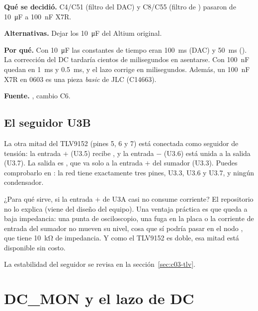 \begin{decision}
\textbf{Qué se decidió.} C4/C51 (filtro del DAC) y C8/C55 (filtro de ) pasaron de \SI{10}{\micro\farad} a
\SI{100}{\nano\farad} X7R.

\textbf{Alternativas.} Dejar los \SI{10}{\micro\farad} del Altium original.

\textbf{Por qué.} Con \SI{10}{\micro\farad} las constantes de tiempo eran \SI{100}{\milli\second} (DAC) y
\SI{50}{\milli\second} (). La corrección del DC tardaría cientos de milisegundos en asentarse. Con
\SI{100}{\nano\farad} quedan en \SI{1}{\milli\second} y \SI{0.5}{\milli\second}, y el lazo corrige en milisegundos.
Además, un \SI{100}{\nano\farad} X7R en 0603 es una pieza \emph{basic} de JLC (C14663).

\textbf{Fuente.} , cambio C6.
\end{decision}

\subsection{El seguidor U3B}

La otra mitad del TLV9152 (pines 5, 6 y 7) está conectada como seguidor de tensión: la entrada $+$ (U3.5) recibe
, y la entrada $-$ (U3.6) está unida a la salida (U3.7). La salida es , que va solo a la entrada
$+$ del sumador (U3.3). Puedes comprobarlo en : la red  tiene exactamente tres
pines, U3.3, U3.6 y U3.7, y ningún condensador.

¿Para qué sirve, si la entrada $+$ de U3A casi no consume corriente? El repositorio no lo explica (viene del diseño del
equipo). Una ventaja práctica es que  queda a baja impedancia: una punta de osciloscopio, una fuga en la
placa o la corriente de entrada del sumador no mueven su nivel, cosa que sí podría pasar en el nodo , que
tiene \SI{10}{\kilo\ohm} de impedancia. Y como el TLV9152 es doble, esa mitad está disponible sin costo.

La estabilidad del seguidor se revisa en la sección~\ref{sec:c03-tlv}.

\section{DC\_MON y el lazo de DC}\label{sec:c03-lazo}

